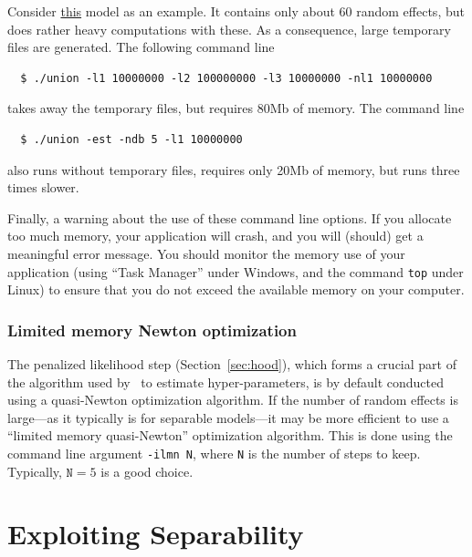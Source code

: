 \documentclass{admbmanual}
\begin{document}
Consider \href{http://otter-rsch.com/admbre/examples/union/union.html}{this} model as an example. It contains only about 60 random effects,
but does rather heavy computations with these. As a consequence, large temporary files are generated.
The following command line
\begin{lstlisting}
  $ ./union -l1 10000000 -l2 100000000 -l3 10000000 -nl1 10000000
\end{lstlisting}
takes away the temporary files, but requires 80Mb of memory. The command line
\begin{lstlisting}
  $ ./union -est -ndb 5 -l1 10000000
\end{lstlisting}
also runs without temporary files, requires only 20Mb of memory, but runs three times slower.

Finally, a warning about the use of these command line options. If you allocate too much memory, your application will crash,
and you will (should) get a meaningful error message. You should monitor the memory use of your application (using ``Task
Manager'' under Windows, and the command \texttt{top} under Linux) to ensure that you do not exceed the available memory
on your computer.


\subsection{Limited memory Newton optimization}

The penalized likelihood step (Section~\ref{sec:hood}), which forms a crucial
part of the algorithm used by \scAB\ to estimate hyper-parameters, is by default conducted using a quasi-Newton
optimization algorithm. If the number of random effects is large---as it typically is for separable models---it
may be more efficient to use a ``limited memory quasi-Newton'' optimization algorithm. This is done using the
command line argument \texttt{-ilmn N}, where \texttt{N} is the number of steps to keep. Typically, $\texttt{N} = 5$
is a good choice. 


\chapter{Exploiting Separability}
\label{separability}
\end{document}
